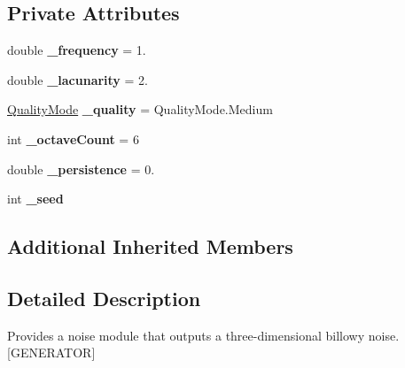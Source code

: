 \subsection*{Private Attributes}
\begin{DoxyCompactItemize}
\item 
\mbox{\label{class_lib_noise_1_1_generator_1_1_billow_a6cd30ab9478101ef0fccc957ebd1b1ca}} 
double {\bfseries \+\_\+frequency} = 1.
\item 
\mbox{\label{class_lib_noise_1_1_generator_1_1_billow_a996222b00218ced18f7479bca0c775a6}} 
double {\bfseries \+\_\+lacunarity} = 2.
\item 
\mbox{\label{class_lib_noise_1_1_generator_1_1_billow_ab117f40c9cba27d0555055a1437952fd}} 
\hyperlink{namespace_lib_noise_ab253d2180e71b8b4b51e250163ca0e27}{Quality\+Mode} {\bfseries \+\_\+quality} = Quality\+Mode.\+Medium
\item 
\mbox{\label{class_lib_noise_1_1_generator_1_1_billow_a3efef72a994bc5ffa475217915122280}} 
int {\bfseries \+\_\+octave\+Count} = 6
\item 
\mbox{\label{class_lib_noise_1_1_generator_1_1_billow_a0beabb5895acd4255424efb29bacbea2}} 
double {\bfseries \+\_\+persistence} = 0.
\item 
\mbox{\label{class_lib_noise_1_1_generator_1_1_billow_a7fba99431e71d2c5eb862bdd528d4a77}} 
int {\bfseries \+\_\+seed}
\end{DoxyCompactItemize}
\subsection*{Additional Inherited Members}


\subsection{Detailed Description}
Provides a noise module that outputs a three-\/dimensional billowy noise. \mbox{[}G\+E\+N\+E\+R\+A\+T\+OR\mbox{]} 



